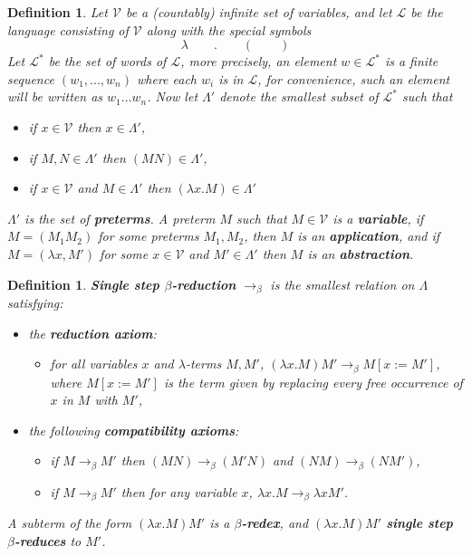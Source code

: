 \documentclass[english,letter paper,12pt,leqno]{article}
\newcommand{\scr}[1]{\mathscr{#1}}
\newtheorem{defn}[theorem]{Definition}
\theoremstyle{example}
\numberwithin{equation}{section}
\begin{document}
\begin{defn}
	\label{lambdacalc}
	Let $\scr{V}$ be a (countably) infinite set of variables, and let $\scr{L}$ be the language consisting of $\scr{V}$ along with the special symbols 
	\[\lambda \qquad . \qquad ( \qquad )\]
	Let $\scr{L}^\ast$ be the set of words of $\scr{L}$, more precisely, an element $w \in \scr{L}^\ast$ is a finite sequence $(w_1,...,w_n)$ where each $w_i$ is in $\scr{L}$, for convenience, such an element will be written as $w_1...w_n$. Now let $\Lambda'$ denote the smallest subset of $\scr{L}^\ast$ such that
	\begin{itemize}
		\item if $x \in \scr{V}$ then $x \in \Lambda'$,
		\item if $M,N \in \Lambda'$ then $(MN) \in \Lambda'$,
		\item if $x \in \scr{V}$ and $M \in \Lambda'$ then $(\lambda x. M) \in \Lambda'$
	\end{itemize}
	$\Lambda'$ is the set of \textbf{preterms}. A preterm $M$ such that $M \in \scr{V}$ is a \textbf{variable}, if $M = (M_1M_2)$ for some preterms $M_1,M_2$, then $M$ is an \textbf{application}, and if $M = (\lambda x, M')$ for some $x \in \scr{V}$ and $M' \in \Lambda'$ then $M$ is an \textbf{abstraction}.
\end{defn}

\begin{defn}
	\textbf{Single step $\beta$-reduction} $\to_\beta$ is the smallest relation on $\Lambda$ satisfying:
	\begin{itemize}
		\item the \textbf{reduction axiom}:
		\begin{itemize}
			\item for all variables $x$ and $\lambda$-terms $M,M'$, $(\lambda x. M)M' \to_\beta M[x := M']$, where $M[x:= M']$ is the term given by replacing every free occurrence of $x$ in $M$ with $M'$,
		\end{itemize}
		\item the following \textbf{compatibility axioms}:
		\begin{itemize}
			\item if $M \to_\beta M'$ then $(MN) \to_\beta (M'N)$ and $(NM) \to_\beta (NM')$,
			\item if $M \to_\beta M'$ then for any variable $x$, $\lambda x. M \to_\beta \lambda x M'$.
		\end{itemize}
	\end{itemize}
	A subterm of the form $(\lambda x. M)M'$ is a \textbf{$\beta$-redex}, and $(\lambda x. M)M'$ \textbf{single step $\beta$-reduces} to $M'$.
\end{defn}
\end{document}

